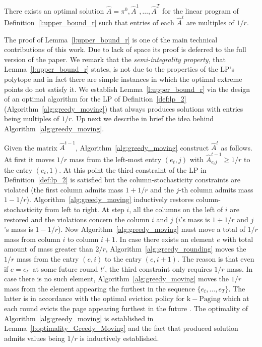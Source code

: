 \begin{lemma}\label{l:upper_bound_r}
There exists an optimal solution $\hat{A} = \pi^0,\hat{A}^1,\ldots,\hat{A}^T$ for the linear program of Definition~\ref{l:upper_bound_r} such that entries of each $\hat{A}^t$ are multiples of $1/r$.
\end{lemma}
The proof of Lemma~\ref{l:upper_bound_r} is one of the main technical contributions of this work. Due to lack of space its proof is deferred to  the full version of the paper. We remark that the \textit{semi-integrality property}, that Lemma~\ref{l:upper_bound_r} states, is not due to the properties of the LP's polytope and in fact there are simple instances in which the optimal extreme points do not satisfy it. We establish Lemma~\ref{l:upper_bound_r} via the design of an optimal algorithm for the LP of Definition~\ref{def:lp_2} (Algorithm~\ref{alg:greedy_moving}) that always produces solutions with entries being multiples of $1/r$. Up next we describe in brief the idea behind Algorithm~\ref{alg:greedy_moving}.

Given the matrix $\hat{A}^{t-1}$, Algorithm~\ref{alg:greedy_moving} construct $\hat{A}^t$ as follows. 
At first it moves $1/r$ mass from the left-most entry $(e_t,j)$ with
$\hat{A}^{t-1}_{e_t j} \geq 1/r$ to the entry $(e_t,1)$. At this point the third constraint of the LP in Definition~\ref{def:lp_2} is satisfied but the column-stochasticity constraints are violated (the first column admits mass $1+1/r$ and the $j$-th column admits mass $1-1/r$). Algorithm~\ref{alg:greedy_moving} inductively restores column-stochasticity from left to right. At step $i$, all the columns on the left of $i$ are restored and the violations concern the column $i$ and $j$ ($i$'s mass is $1+1/r$ and $j$'s mass is $1-1/r$). Now Algorithm~\ref{alg:greedy_moving} must move a total of $1/r$ mass from column $i$ to column $i+1$. In case there exists an element $e$ with total amount of mass greater than $2/r$, Algorithm~\ref{alg:greedy_rounding} moves the $1/r$ mass from the entry $(e,i)$ to the entry $(e,i+1)$. The reason is that even if $e = e_{t'}$
at some future round $t'$, the third constraint only requires $1/r$ mass. In case there is no such element, Algorithm~\ref{alg:greedy_moving} moves the $1/r$ mass from the element appearing the furthest in the sequence $\{e_t,\ldots,e_T\}$. The latter is in accordance with the optimal eviction policy for $\mathrm{k}-\mathrm{Paging}$ which at each round evicts the page appearing furthest in the future \cite{BBN12}. The optimality of Algorithm~\ref{alg:greedy_moving} is established in Lemma~\ref{l:optimality_Greedy_Moving} and the fact that produced solution admits values being $1/r$ is inductively established. 


